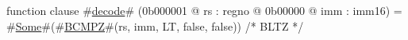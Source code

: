 function clause #\hyperref[zdecode]{decode}# (0b000001 @ rs : regno @ 0b00000 @ imm : imm16) =
  #\hyperref[zSome]{Some}#(#\hyperref[zBCMPZ]{BCMPZ}#(rs, imm, LT, false, false)) /* BLTZ */
